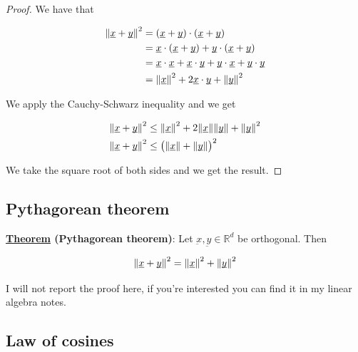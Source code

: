 \documentclass[10pt]{extarticle}
\newcommand{\R}{\mathbb{R}}
\newcommand{\munderbar}[1]{\underbar{\ensuremath{#1}}}
\begin{document}
\begin{proof}
    We have that

    \begin{align*}
        \norm{\munderbar{x} + \munderbar{y}}^2 & = (\munderbar{x} + \munderbar{y}) \cdot (\munderbar{x} + \munderbar{y})                                                                         \\
                                               & = \munderbar{x} \cdot (\munderbar{x} + \munderbar{y}) + \munderbar{y} \cdot (\munderbar{x} + \munderbar{y})                                     \\
                                               & = \munderbar{x} \cdot \munderbar{x} + \munderbar{x} \cdot \munderbar{y} + \munderbar{y} \cdot \munderbar{x} + \munderbar{y} \cdot \munderbar{y} \\
                                               & = \norm{\munderbar{x}}^2 + 2 \munderbar{x} \cdot \munderbar{y} + \norm{\munderbar{y}}^2
    \end{align*}

    We apply the Cauchy-Schwarz inequality and we get

    \begin{align*}
        \norm{\munderbar{x} + \munderbar{y}}^2 & \leq \norm{\munderbar{x}}^2 + 2 \norm{\munderbar{x}} \norm{\munderbar{y}} + \norm{\munderbar{y}}^2 \\
        \norm{\munderbar{x} + \munderbar{y}}^2 & \leq \left(\norm{\munderbar{x}} + \norm{\munderbar{y}}\right)^2
    \end{align*}

    We take the square root of both sides and we get the result.
\end{proof}

\subsection{Pythagorean theorem}

\textbf{\underline{Theorem} (Pythagorean theorem)}: Let $\munderbar{x}, \munderbar{y} \in \R^d$ be orthogonal. Then

$$
    \norm{\munderbar{x} + \munderbar{y}}^2 = \norm{\munderbar{x}}^2 + \norm{\munderbar{y}}^2
$$

I will not report the proof here, if you're interested you can find it in my linear algebra notes.

\subsection{Law of cosines}
\end{document}
